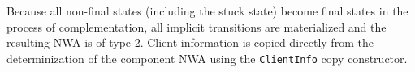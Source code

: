 Because all non-final states (including the stuck state) become final states
in the process of complementation, all implicit transitions are materialized
and the resulting NWA is of type 2.  Client information is copied directly
from the determinization of the component NWA using the \texttt{ClientInfo}
copy constructor.

